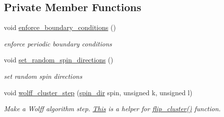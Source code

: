 \subsection*{Private Member Functions}
\begin{DoxyCompactItemize}
\item 
void \mbox{\hyperlink{classIsingModel_abe2a720ca3ed7dde191e36fbf33561b3}{enforce\+\_\+boundary\+\_\+conditions}} ()
\begin{DoxyCompactList}\small\item\em enforce periodic boundary conditions \end{DoxyCompactList}\item 
void \mbox{\hyperlink{classIsingModel_a6ab9293015326da93fb6e3e20d24edf8}{set\+\_\+random\+\_\+spin\+\_\+directions}} ()
\begin{DoxyCompactList}\small\item\em set random spin directions \end{DoxyCompactList}\item 
void \mbox{\hyperlink{classIsingModel_a37758a1a4a2536d16f1bb8166e13f7b6}{wolff\+\_\+cluster\+\_\+step}} (\mbox{\hyperlink{classspin__dir}{spin\+\_\+dir}} spin, unsigned k, unsigned l)
\begin{DoxyCompactList}\small\item\em Make a Wolff algorithm step. \mbox{\hyperlink{classThis}{This}} is a helper for \mbox{\hyperlink{classIsingModel_ab76a4eee808eaa1979ff6707498e9908}{flip\+\_\+cluster()}} function. \end{DoxyCompactList}\end{DoxyCompactItemize}
